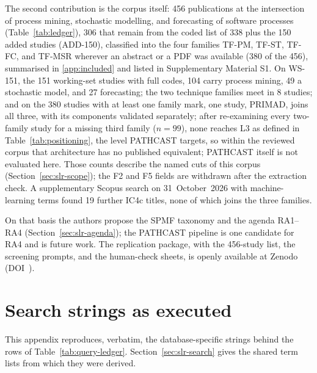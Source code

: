 The second contribution is the corpus itself: 456 publications at the
intersection of process mining, stochastic modelling, and forecasting of
software processes (Table~\ref{tab:ledger}), 306 that remain from the
coded list of 338 plus the 150 added studies (ADD-150), classified into
the four families TF-PM, TF-ST, TF-FC, and TF-MSR wherever an abstract or
a PDF was available (380 of the 456), summarised in \ref{app:included} and listed in Supplementary Material S1. On WS-151, the 151 working-set studies with full
codes, 104 carry process mining, 49 a stochastic model, and 27
forecasting; the two technique families meet in 8 studies; and on the
380 studies with at least one family mark, one study, PRIMAD, joins all
three, with its components validated separately; after re-examining
every two-family study for a missing third family ($n = 99$), none
reaches L3 as defined in Table~\ref{tab:positioning}, the level PATHCAST
targets, so within the reviewed corpus that architecture has no published
equivalent; PATHCAST itself is not evaluated here.
Those counts describe
the named cuts of this corpus (Section~\ref{sec:slr-scope}); the F2 and
F5 fields are withdrawn after the extraction check. A supplementary Scopus
search on 31~October~2026 with machine-learning terms found 19 further
IC4c titles, none of which joins the three families.

On that basis the authors propose the SPMF taxonomy and the agenda
RA1--RA4 (Section~\ref{sec:slr-agenda}); the PATHCAST pipeline is one
candidate for RA4 and is future work. The replication package, with the
456-study list, the screening prompts, and the human-check sheets, is
openly available at Zenodo (DOI~\zenododoi).

\appendix
\section{Search strings as executed}
\label{app:strings}

This appendix reproduces, verbatim, the database-specific strings behind
the rows of Table~\ref{tab:query-ledger}. Section~\ref{sec:slr-search}
gives the shared term lists from which they were derived.

